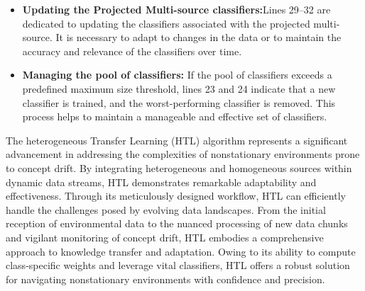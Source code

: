 \begin{itemize}
	\item \textbf{Updating the Projected Multi-source classifiers:}Lines 29–32 are dedicated to updating the classifiers associated with the projected multi-source. It is necessary to adapt to changes in the data or to maintain the accuracy and relevance of the classifiers over time.
	\item \textbf{Managing the pool of classifiers:} If the pool of classifiers exceeds a predefined maximum size threshold, lines 23 and 24 indicate that a new classifier is trained, and the worst-performing classifier is removed. This process helps to maintain a manageable and effective set of classifiers.
\end{itemize}
The heterogeneous Transfer Learning (HTL) algorithm represents a significant advancement in addressing the complexities of nonstationary environments prone to concept drift. By integrating heterogeneous and homogeneous sources within dynamic data streams, HTL demonstrates remarkable adaptability and effectiveness. Through its meticulously designed workflow, HTL can efficiently handle the challenges posed by evolving data landscapes. From the initial reception of environmental data to the nuanced processing of new data chunks and vigilant monitoring of concept drift, HTL embodies a comprehensive approach to knowledge transfer and adaptation. Owing to its ability to compute class-specific weights and leverage vital classifiers, HTL offers a robust solution for navigating nonstationary environments with confidence and precision.


